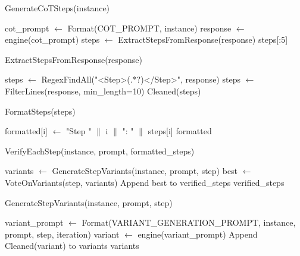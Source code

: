 \documentclass{article}
\begin{document}
\begin{algorithm}
\caption{GenerateCoTSteps(instance)}
\begin{algorithmic}[1]
\State cot\_prompt $\gets$ Format(COT\_PROMPT, instance)
\State response $\gets$ engine(cot\_prompt)
\State steps $\gets$ ExtractStepsFromResponse(response)
\State \Return steps[:5]
\end{algorithmic}
\end{algorithm}

\begin{algorithm}
\caption{ExtractStepsFromResponse(response)}
\begin{algorithmic}[1]
\State steps $\gets$ RegexFindAll("<Step>(.*?)</Step>", response)
    \State steps $\gets$ FilterLines(response, min\_length=10)
\EndIf
\State \Return Cleaned(steps)
\end{algorithmic}
\end{algorithm}

\begin{algorithm}
\caption{FormatSteps(steps)}
\begin{algorithmic}[1]
    \State formatted[i] $\gets$ "Step " $\|$ i $\|$ ": " $\|$ steps[i]
\EndFor
\State \Return formatted
\end{algorithmic}
\end{algorithm}

\begin{algorithm}
\caption{VerifyEachStep(instance, prompt, formatted\_steps)}
\begin{algorithmic}[1]
    \State variants $\gets$ GenerateStepVariants(instance, prompt, step)
    \State best $\gets$ VoteOnVariants(step, variants)
    \State Append best to verified\_steps
\EndFor
\State \Return verified\_steps
\end{algorithmic}
\end{algorithm}

\begin{algorithm}
\caption{GenerateStepVariants(instance, prompt, step)}
\begin{algorithmic}[1]
    \State variant\_prompt $\gets$ Format(VARIANT\_GENERATION\_PROMPT, instance, prompt, step, iteration)
    \State variant $\gets$ engine(variant\_prompt)
    \State Append Cleaned(variant) to variants
\EndFor
\State \Return variants
\end{algorithmic}
\end{algorithm}
\end{document}
